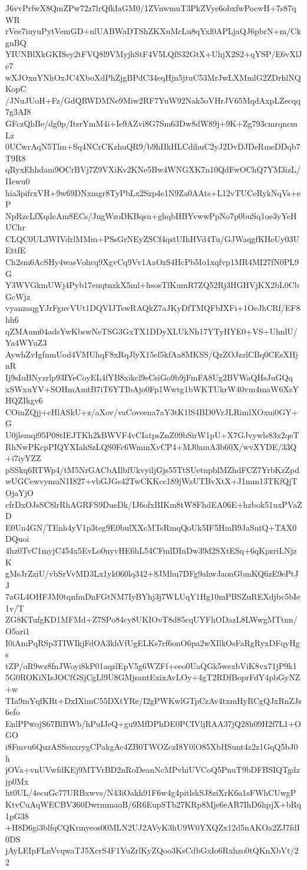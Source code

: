 J6vvPrfwX8QmZPw72z7lrQfkIaGM0/1ZVnwmuT3PkZVye6obxfwPocwH+7s87qWR
rVee7iuyuPytVemGD+nlUABWaDTShZKXuMcLu8qYxl0APLjaQJ6pbrN+m/CkgnBQ
YIUNBlXkGKISey2tFVQ8l9VMyjhStF4V5LQfS32GtX+UhjX2S2+qYSP/E6vXlJe7
wXJOxnYNhOxJC4XboXdPhZjgBPdC34eqHjn5jtuC53MrJwLXMmlG2ZDrhlNQKopC
/JNuJUoH+Fz/GdQRWDMNe9Miw2RF7YuW92Nak5oVHrJV65MqdAxpLZecqq7g3AI8
GFczQhBe/dg0p/ItsrYmM4i+Ie9AZvi8G7Sm63Dw8dW89j+9K+Zg793cmrqncmLz
0UCwrAqN5Tlm+Sq4NCrCKzhuQR9/b9hIIkHLCdihuC2yJ2DvDJDeRmeDDqb7T9R8
qRyxEhhdam9OCrBVj7Z9VXiKv2KNe5Bw4WNGXK7n10QdFwOChQ7YM3izL/IIewu0
hia3pifrxVH+9w69DNxmgr8TyPbLx2Szp4e1N9Za0AAts+L12vTUCeRykNqVs+eP
NpRzcLfXqdcAm8ECs/JugWzoDKBqsu+ghqbHBYvwwPpNo7p0buSq1oe3yYeHUChr
CLQC0UL3WIVdrlMMm+PSsGrNEyZSCf4qstUIhHVd4Tu/GJWaqgfKHeUy03UEttfE
Ch2sm6AcSHy4wasVohcq9XgvCq9Vv1AaOzS4HcPb5Io1xqfvp1MR4MI27fN0PL9G
Y3WVGkmUWj4Pyb17euqtnzkX5ml+hsosTfKumR7ZQ52Rj3HGHVjKX2bL0CbGcWjz
vyanzaqgYJrFgnvVUt1DQVIJTswRAQkZ7aJKyDfTMQFbIXFi+1OeJhCRf/EF8hh6
qZMAum04adsYwKbswNeTSG3GxTX1DDyXLUkNh17YTyHYE0+VS+UhnlU/Ya4WYuZ3
AywhZvIgfnmUod4VMUhqF8xRqJlyX15el5kfAa8MKSS/QzZOJzzlCBq0CEsXHjnR
Ij9sIuBNyzrlp93IYeCoyEL4fYB8xikcl9eCsiGo9b9jFmFA8Ug2BVWaQHsJuGQq
xSWxuYV+SOHmAmtB7iT6YTIbAjo0Fp1Wwtg1bWKTUkrW40vm4maW6XsYHQZIkgv6
COinZQjj+cHlASkU+z/aXov/vaCoveena7aY3tK1lS4BD0VrJLRimlXOxui0GY+G
U0jlemqi95P08tIEJTKh2kBWVF4vCIatpsZnZ09bSirW1pU+X7GJvywls83x2qeT
RhNwPKcpPIQYXIahSzLQS0Fc6WmmXvCP4+MJ0amA3b60X/wvXYDE/33Q+i7iyYZZ
pSSkq6RTWp4/tM5NrGACbAIlbfUkvyiljGjs55TtSUetnpblMZhdFCZ7YrbKzZpd
wUGCewvymuN1I827+vbGJGs42TwCKKcc189jWzUTBvXtX+J1mm13TKfQjTOjaYjO
cfrDxOJsSC8lrRhAGRFS9DueDk/IJ6ofxBIKm8tW8FhdEA06E+hzbok51uxPVaZD
E0Un4GN/TEnh4yV1p3teg9E0bulXXcMTsRmqQoUk5IF5HmB9JaSntQ+TAX0DQuoi
4hz0TvC1myjC454x5EvLo0uyvHE6hL54CFmlDInDw39d2SXtESq+6qKpzriLNjzK
gMsJrZziU/vbSrVvMD3Lx1yk060lq342+8JMhu7DFg9ahwJaonGbmKQ6zE9ePtJJ
7aGL4OHFJM0tqnfmDnFGtNM7IyBYhj3j7WLUqY1Hg10mPBSZuREXdjbc5bIe1v/T
ZG8KTufgKD1MFMd+Z7SPo84cy8UKIOvT8d85cqUYFhODazL8LWwgMTtnn/O5ari1
I0iAmPqRSp3TIWIkjFdOA3khVfUgELKs7rf6onO6pa2wXIlkOsFaRgRyxDFqyHgs
tZP/oR9wz8fnJWoyi8kP01aqzlEpV5g6WZFf+eeo0UaQGk5wexbViK8vx71jP9k1
5G0ROKiNIsJOCfGSjCgLl9U8GMjsantExixAvLOy+4gT2RDfBoprFdY4pbGyNZ+w
TIa9mYqfKRt+DxIXimC55DXtYRe/I2gPWKwlGTpCzAv4txmHyRCgQJxRnZJs6efo
EnlPPwojS67BlBWb/hPuIJeQ+gu9MfDPhDE0PCIVljRAA37jQ28h09H2f7L1+OGO
i8Fmvu6QuzASSsnxrygCPakgAc4ZB0TWOZczI8Y0lO85XbHSunt4z2z1GqQ5bJ0h
jOVa+vnUVwfdKEj9MTVrBD2nRoDeanNcMPvhiUVCoQ5PnuT9bDFBSIQTgdzjp0Mx
ht0UL/4ecuGc77URBxwvs/N43iOakh91F6w4g4pitlskSJ8ziXrK6a1sFWhCUwgP
KtvCuAqWECBV360DwrmmaoB/6R6EupSTb27KRp8Mje6eAR7IhD6hpjX+bRq1pG38
+H8D6gi3blfqCQKrmyeos00MLN2UJ2AVyK3hU9W0YXQZx12d5nAKOa2ZJ7fdI0DS
jAyLEIpFLnVvqwaTJ5XcrS4F1YuZrlKyZQoo3KsCdbGxIo6Rxhzo0tQKnXbVt/22
